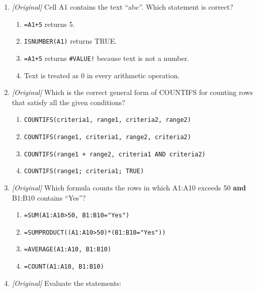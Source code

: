 \documentclass[11pt]{article}
\begin{document}
\begin{enumerate}[label=\textbf{Q\arabic*.}, leftmargin=*]
  result is:
  \begin{enumerate}[label=\Alph*.]
    \item High, because a blank cell is read as 100.
    \item Medium, because a blank cell skips the first test.
    \item Low, because a blank cell is treated as 0 in the comparison.
    \item \texttt{\#VALUE!}, because a blank cell always causes an error.
  \end{enumerate}
\item \textit{[Original]} Cell A1 contains the text ``abc''. Which statement
  is correct?
  \begin{enumerate}[label=\Alph*.]
    \item \texttt{=A1+5} returns 5.
    \item \texttt{ISNUMBER(A1)} returns TRUE.
    \item \texttt{=A1+5} returns \texttt{\#VALUE!} because text is not a
      number.
    \item Text is treated as 0 in every arithmetic operation.
  \end{enumerate}
\item \textit{[Original]} Which is the correct general form of COUNTIFS for
  counting rows that satisfy all the given conditions?
  \begin{enumerate}[label=\Alph*.]
    \item \texttt{COUNTIFS(criteria1, range1, criteria2, range2)}
    \item \texttt{COUNTIFS(range1, criteria1, range2, criteria2)}
    \item \texttt{COUNTIFS(range1 + range2, criteria1 AND criteria2)}
    \item \texttt{COUNTIFS(range1; criteria1; TRUE)}
  \end{enumerate}
\item \textit{[Original]} Which formula counts the rows in which A1:A10 exceeds
  50 \textbf{and} B1:B10 contains ``Yes''?
  \begin{enumerate}[label=\Alph*.]
    \item \texttt{=SUM(A1:A10>50, B1:B10="Yes")}
    \item \texttt{=SUMPRODUCT((A1:A10>50)*(B1:B10="Yes"))}
    \item \texttt{=AVERAGE(A1:A10, B1:B10)}
    \item \texttt{=COUNT(A1:A10, B1:B10)}
  \end{enumerate}
\item \textit{[Original]} Evaluate the statements:

\end{enumerate}
\end{document}
